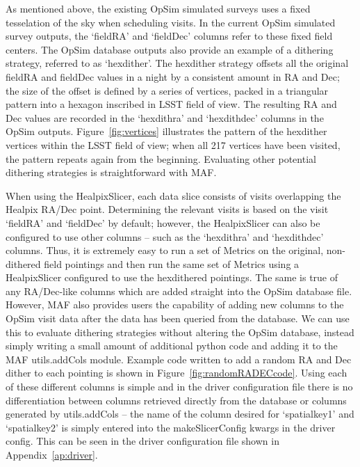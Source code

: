 \documentclass[]{spie}  %
\begin{document}
As mentioned above, the existing OpSim simulated surveys uses a fixed
tesselation of the sky when scheduling visits. In the current OpSim
simulated survey outputs, the `fieldRA' and `fieldDec' columns refer
to these fixed field centers. The OpSim database outputs also provide
an example of a dithering strategy, referred to as `hexdither'. The
hexdither strategy offsets all the original fieldRA and fieldDec
values in a night by a consistent amount in RA and Dec; the size of
the offset is defined by a series of vertices, packed in a triangular
pattern into a hexagon inscribed in LSST field of view.  The resulting
RA and Dec values are recorded in the `hexdithra' and `hexdithdec'
columns in the OpSim outputs.  Figure~\ref{fig:vertices} illustrates
the pattern of the hexdither vertices within the LSST field of view;
when all 217 vertices have been visited, the pattern repeats again
from the beginning.  Evaluating other potential dithering strategies is
straightforward with MAF.

When using the HealpixSlicer, each data slice consists of visits
overlapping the Healpix RA/Dec point. Determining the relevant visits
is based on the visit `fieldRA' and `fieldDec' by default; however,
the HealpixSlicer can also be configured to use other columns -- such
as the `hexdithra' and `hexdithdec' columns. Thus, it is extremely
easy to run a set of Metrics on the original, non-dithered field
pointings and then run the same set of Metrics using a HealpixSlicer
configured to use the hexdithered pointings. The same is true of any
RA/Dec-like columns which are added straight into the OpSim database
file. However, MAF also provides users the capability of adding new
columns to the OpSim visit data after the data has been queried from the database. We can use this to
evaluate dithering strategies without altering the OpSim database,
instead simply writing a small amount of additional python code and
adding it to the MAF utils.addCols module.  Example code written to
add a random RA and Dec dither to each pointing is shown in
Figure~\ref{fig:randomRADECcode}.  Using each of these different
columns is simple and in the driver configuration file there is no
differentiation between columns retrieved directly from the database
or columns generated by utils.addCols -- the name of the column
desired for `spatialkey1' and `spatialkey2' is simply entered into the
makeSlicerConfig kwargs in the driver config. This can be seen in the
driver configuration file shown in Appendix~\ref{ap:driver}.
\end{document}
